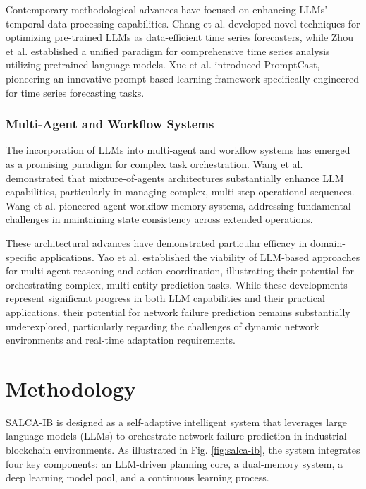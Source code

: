 \documentclass[conference]{IEEEtran}
\begin{document}
Contemporary methodological advances have focused on enhancing LLMs' temporal data processing capabilities. Chang et al. \cite{chang2024} developed novel techniques for optimizing pre-trained LLMs as data-efficient time series forecasters, while Zhou et al. \cite{zhou2023} established a unified paradigm for comprehensive time series analysis utilizing pretrained language models. Xue et al. \cite{xue2023} introduced PromptCast, pioneering an innovative prompt-based learning framework specifically engineered for time series forecasting tasks.

\subsubsection{Multi-Agent and Workflow Systems}
The incorporation of LLMs into multi-agent and workflow systems has emerged as a promising paradigm for complex task orchestration. Wang et al. \cite{wang2024} demonstrated that mixture-of-agents architectures substantially enhance LLM capabilities, particularly in managing complex, multi-step operational sequences. Wang et al. \cite{wang2024agent} pioneered agent workflow memory systems, addressing fundamental challenges in maintaining state consistency across extended operations.

These architectural advances have demonstrated particular efficacy in domain-specific applications. Yao et al. \cite{yao2023} established the viability of LLM-based approaches for multi-agent reasoning and action coordination, illustrating their potential for orchestrating complex, multi-entity prediction tasks. While these developments represent significant progress in both LLM capabilities and their practical applications, their potential for network failure prediction remains substantially underexplored, particularly regarding the challenges of dynamic network environments and real-time adaptation requirements.

\section{Methodology}

SALCA-IB is designed as a self-adaptive intelligent system that leverages large language models (LLMs) to orchestrate network failure prediction in industrial blockchain environments. As illustrated in Fig. \ref{fig:salca-ib}, the system integrates four key components: an LLM-driven planning core, a dual-memory system, a deep learning model pool, and a continuous learning process.
\end{document}
